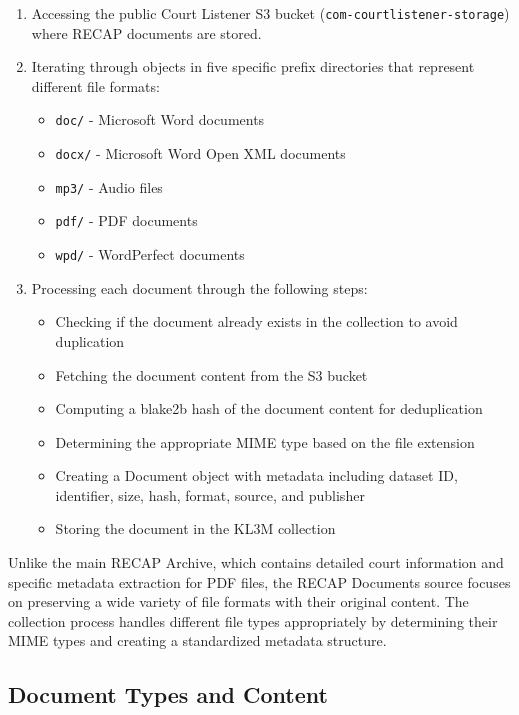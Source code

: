 \begin{enumerate}
    \item Accessing the public Court Listener S3 bucket (\texttt{com-courtlistener-storage}) where RECAP documents are stored.
    \item Iterating through objects in five specific prefix directories that represent different file formats:
    \begin{itemize}
        \item \texttt{doc/} - Microsoft Word documents
        \item \texttt{docx/} - Microsoft Word Open XML documents
        \item \texttt{mp3/} - Audio files
        \item \texttt{pdf/} - PDF documents
        \item \texttt{wpd/} - WordPerfect documents
    \end{itemize}
    \item Processing each document through the following steps:
    \begin{itemize}
        \item Checking if the document already exists in the collection to avoid duplication
        \item Fetching the document content from the S3 bucket
        \item Computing a blake2b hash of the document content for deduplication
        \item Determining the appropriate MIME type based on the file extension
        \item Creating a Document object with metadata including dataset ID, identifier, size, hash, format, source, and publisher
        \item Storing the document in the KL3M collection
    \end{itemize}
\end{enumerate}

Unlike the main RECAP Archive, which contains detailed court information and specific metadata extraction for PDF files, the RECAP Documents source focuses on preserving a wide variety of file formats with their original content. The collection process handles different file types appropriately by determining their MIME types and creating a standardized metadata structure.

\subsection{Document Types and Content}

